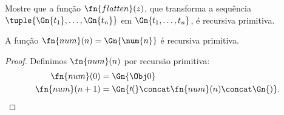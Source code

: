 \documentclass[../../../include/open-logic-section]{subfiles}
\begin{document}
\begin{prob}
Mostre que a função $\fn{flatten}(z)$, que transforma a sequência
$\tuple{\Gn{t_1}, \dots, \Gn{t_n}}$ em $\Gn{t_1, \dots, t_n}$, é
recursiva primitiva.
\end{prob}

\begin{prop}
  A função $\fn{num}(n) = \Gn{\num{n}}$ é recursiva primitiva.
\end{prop}

\begin{proof}
  Definimos $\fn{num}(n)$ por recursão primitiva:
  \begin{align*}
    \fn{num}(0) & = \Gn{\Obj 0}\\
    \fn{num}(n+1) & = \Gn{\prime(} \concat \fn{num}(n) \concat \Gn{)}.
  \end{align*}
\end{proof}
\end{document}
